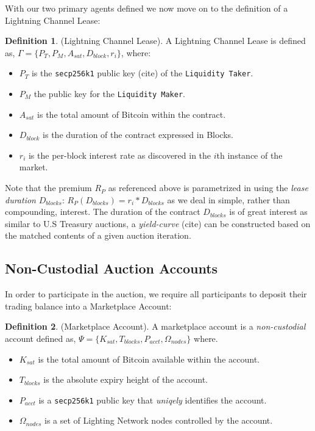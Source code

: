 \documentclass[10pt,a4paper]{article}
\theoremstyle{definition}
\newtheorem{definition}{Definition}[section]
\begin{document}
With our two primary agents defined we now move on to the definition of a
Lightning Channel Lease: 

\begin{definition}{(Lightning Channel Lease).} 
    A Lightning Channel Lease is defined as, $\Gamma = \{P_{T}, P_{M}, A_{sat},
    D_{block}, r_{i} \}$, where:
\end{definition}

\begin{itemize}
    \item $P_{T}$ is the \texttt{secp256k1} public key (cite) of the
\texttt{Liquidity Taker}. 
    \item $P_{M}$ the public key for the \texttt{Liquidity Maker}. 
    \item $A_{sat}$ is the total amount of Bitcoin within the contract.
    \item $D_{block}$ is the duration of the contract expressed in Blocks.
    \item $r_{i}$ is the per-block interest rate as discovered in the $i$th
    instance of the market.
\end{itemize}

Note that the premium $R_{P}$ as referenced above is parametrized in using the
\emph{lease duration} $D_{blocks}$: $R_{P}(D_{blocks}) = r_i * D_{blocks}$ as
we deal in simple, rather than compounding, interest.  The duration of the
contract $D_{blocks}$ is of great interest as similar to U.S Treasury auctions,
a \emph{yield-curve} (cite) can be constructed based on the matched contents of
a given auction iteration. %


\subsection{Non-Custodial Auction Accounts}

In order to participate in the auction, we require all participants to deposit their
trading balance into a Marketplace Account:

\theoremstyle{definition}
\begin{definition}{(Marketplace Account).}
A marketplace account is a \emph{non-custodial} account defined as, $\Psi =
\{K_{sat}, T_{blocks}, P_{acct}, \Omega_{nodes} \}$ where.
\end{definition}

\begin{itemize}
    \item $K_{sat}$ is the total amount of Bitcoin available within the account.
    \item $T_{blocks}$ is the absolute expiry height of the account. 
    \item $P_{acct}$ is a \texttt{secp256k1} public key  that \emph{uniqely} identifies the account.
    \item $\Omega_{nodes}$ is a set of Lighting Network nodes controlled by the account.
\end{itemize}
\end{document}
